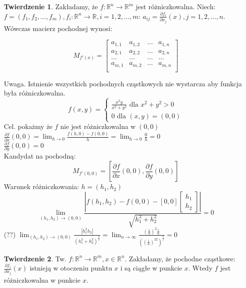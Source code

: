 \documentclass{article}
\theoremstyle{definition}
\theoremstyle{definition}
\newtheorem{tw}{Twierdzenie}[subsection]
\theoremstyle{definition}
\theoremstyle{definition}
\begin{document}
\begin{tw}
    Zakładamy, że $f:\mathbb{R}^n\rightarrow\mathbb{R}^m$ jest różniczkowalna. 
    Niech: $f=(f_1,f_2,\dots,f_m), f_{i}: \mathbb{R}^n\rightarrow\mathbb{R}, i = 1,2,\dots,m$:
    $a_{ij} = \frac{\partial f_i}{\partial x_j} (x), j = 1,2,\dots,n$. Wówczas macierz pochodnej wynosi:
    \begin{center}
        \[M_{f'(x)}=\begin{bmatrix}
            a_{1,1} & a_{1,2} & \dots & a_{1,n} \\
            a_{2,1} & a_{2,2} & \dots & a_{2,n} \\
            \dots & \dots & \dots & \dots \\
            a_{m,1} & a_{m,2} & \dots & a_{m,n} \\
            \end{bmatrix}\]
    \end{center}
\end{tw}

Uwaga. Istnienie wszystkich pochodnych cząstkowych nie wystarcza aby funkcja była różniczkowalna.
$$
f(x,y)=\begin{cases} 
    \frac{x^2y}{x^2+y^2} \text{ dla } x^2+y^2>0\\
    0 \text{ dla } (x,y)=(0,0) 
\end{cases}
$$
Cel. pokażmy że $f$ nie jest różniczkowalna w $(0,0)$\\
$\frac{\partial f}{\partial x} (0,0) = \lim_{h\rightarrow 0} \frac{f(h,0)-f(0,0)}{h} = \lim_{h\rightarrow 0} \frac{0}{h} = 0$\\
$\frac{\partial f}{\partial y} (0,0) = 0$\\
Kandydat na pochodną:
$$
M_{f'(0,0)} = \left[\frac{\partial f}{\partial x} (0,0),\frac{\partial f}{\partial y} (0,0)\right]
$$
Warunek różniczkowania: $h=(h_1,h_2)$\\
$$
\lim_{(h_1,h_2)\rightarrow(0,0)}
\frac{\left|f(h_1,h_2) - f(0,0) - [0,0]
    \left[\begin{matrix}
    h_1\\h_2\end{matrix}\right]
    \right|}{\sqrt{h_1^2 + h_2^2}} = 0
$$ (??)
$
\lim_{(h_1,h_2)\rightarrow (0,0)} \frac{|h_1^2 h_2|}{(h_1^2+h_2^2)^{\frac{3}{2}}}=
\lim_{n\rightarrow \infty} \frac{\left(\frac{1}{n}\right)^2\frac{1}{n}}{\left((\frac{1}{n})^22\right)^{\frac{3}{2}}}=0
$

\begin{tw}
    Tw. $f: \mathbb{R}^n \rightarrow \mathbb{R}^m, x\in\mathbb{R}^n$. Zakładamy, że pochodne cząstkowe: $\frac{\partial f_i}{\partial x_j} (x)$
    istnieją w otoczeniu punktu $x$ i są ciągłe w punkcie $x$. Wtedy $f$ jest różniczkowalna w punkcie $x$.
\end{tw}
\end{document}
